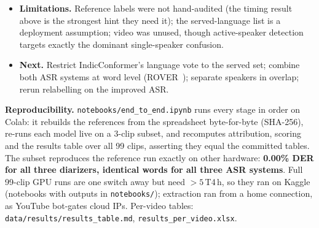 \documentclass[10pt]{article}
\newcommand{\sys}[1]{\texttt{#1}}
\begin{document}
\begin{itemize}
  \item \textbf{Limitations.} Reference labels were not hand-audited (the timing result above is the strongest hint they
        need it); the served-language list is a deployment assumption; video was unused, though active-speaker detection
        targets exactly the dominant single-speaker confusion.
  \item \textbf{Next.} Restrict IndicConformer's language vote to the served set; combine both ASR systems at word level
        (ROVER~\citep{fiscus1997rover}); separate speakers in overlap; rerun relabelling on the improved ASR.
\end{itemize}

\textbf{Reproducibility.} \sys{notebooks/end\_to\_end.ipynb} runs every stage in order on Colab: it rebuilds the
references from the spreadsheet byte-for-byte (SHA-256), re-runs each model live on a 3-clip subset, and recomputes
attribution, scoring and the results table over all 99 clips, asserting they equal the committed tables. The subset
reproduces the reference run exactly on other hardware: \textbf{0.00\% DER for all three diarizers, identical words for
all three ASR systems}. Full 99-clip GPU runs are one switch away but need $>5$\,T4\,h, so they ran on Kaggle
(notebooks with outputs in \sys{notebooks/}); extraction ran from a home connection, as YouTube bot-gates cloud IPs.
Per-video tables: \sys{data/results/results\_table.md}, \sys{results\_per\_video.xlsx}.
\end{document}
